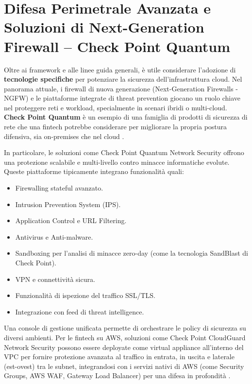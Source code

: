 \section{Difesa Perimetrale Avanzata e Soluzioni di Next-Generation Firewall – Check Point Quantum}
\label{sec:checkpoint_quantum}
Oltre ai framework e alle linee guida generali, è utile considerare l'adozione di \textbf{tecnologie specifiche} per potenziare la sicurezza dell'infrastruttura cloud. Nel panorama attuale, i firewall di nuova generazione (Next-Generation Firewalls - NGFW) e le piattaforme integrate di threat prevention giocano un ruolo chiave nel proteggere reti e workload, specialmente in scenari ibridi o multi-cloud. \textbf{Check Point Quantum} è un esempio di una famiglia di prodotti di sicurezza di rete che una fintech potrebbe considerare per migliorare la propria postura difensiva, sia on-premises che nel cloud \cite{checkpointQuantum}.

In particolare, le soluzioni come Check Point Quantum Network Security offrono una protezione scalabile e multi-livello contro minacce informatiche evolute. Queste piattaforme tipicamente integrano funzionalità quali:
\begin{itemize}
    \item Firewalling stateful avanzato.
    \item Intrusion Prevention System (IPS).
    \item Application Control e URL Filtering.
    \item Antivirus e Anti-malware.
    \item Sandboxing per l'analisi di minacce zero-day (come la tecnologia SandBlast di Check Point).
    \item VPN e connettività sicura.
    \item Funzionalità di ispezione del traffico SSL/TLS.
    \item Integrazione con feed di threat intelligence.
\end{itemize}
Una console di gestione unificata permette di orchestrare le policy di sicurezza su diversi ambienti. Per le fintech su AWS, soluzioni come Check Point CloudGuard Network Security possono essere deployate come virtual appliance all'interno del VPC per fornire protezione avanzata al traffico in entrata, in uscita e laterale (est-ovest) tra le subnet, integrandosi con i servizi nativi di AWS (come Security Groups, AWS WAF, Gateway Load Balancer) per una difesa in profondità \cite{awsCheckPoint}.

